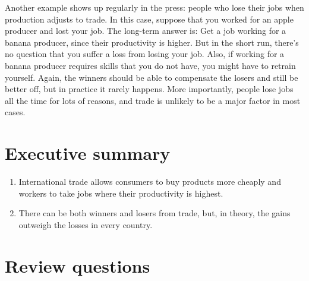 Another example shows up regularly in the press: people who lose their
jobs when production adjusts to trade.  In this case, suppose that you
worked for an apple producer and lost your job. The long-term
answer is:  Get a job working for a banana producer, since their
productivity is higher. But in the short run, there's no question
that you suffer a loss from losing your job. Also, if working for a
banana producer requires skills that you do not have, you might
have to retrain yourself. Again, the winners should be able to
compensate the losers and still be better off, but in practice it
rarely happens. More importantly, people lose jobs all the time for lots of
reasons, and trade is unlikely to be a major factor in most cases.


\section*{Executive summary}

\setlength{\leftmargini}{0.5\oldleftmargini}
\begin{enumerate}
\item International trade allows consumers to buy products more cheaply
and workers to take jobs where their productivity is highest.

\item There can be both winners and losers from trade,
but, in theory, the gains outweigh the losses in every country.
\end{enumerate}
\setlength{\leftmargini}{\oldleftmargini}

\section*{Review questions}

